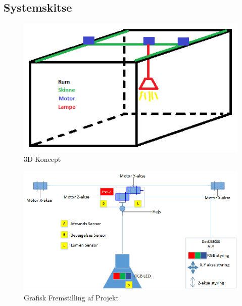 \subsection{Systemskitse}

\begin{figure}[H] \centering
    \includegraphics[width=\textwidth]{0_Filer/Figuer/3D_Koncept.png}
    \caption{3D Koncept}
    \label{fig:3Dkoncept}
\end{figure}

\begin{figure}[H] \centering
    \includegraphics[width=\textwidth]{0_Filer/Figuer/Grafisk_Fremstilling_af_Projekt.png}
    \caption{Grafisk Fremstilling af Projekt}
    \label{fig:GrafiskFremstillingAfProjekt}
\end{figure}